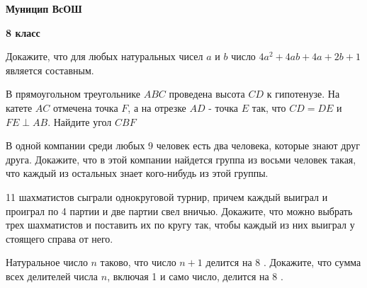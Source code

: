 \centerline{\bf \Huge Муницип ВсОШ}
\centerline{\bf \Huge 8 класс}

\begin{flushright}
        \scriptsize{}
\end{flushright}

Докажите, что для любых натуральных чисел $a$ и $b$ число $4 a^2+4 a b+4 a+2 b+1$ является составным.


В прямоугольном треугольнике $A B C$ проведена высота $C D$ к гипотенузе. На катете $A C$ отмечена точка $F$, а на отрезке $A D$ - точка $E$ так, что $C D=D E$ и $F E \perp A B$. Найдите угол $C B F$


В одной компании среди любых 9 человек есть два человека, которые знают друг друга. Докажите, что в этой компании найдется группа из восьми человек такая, что каждый из остальных знает кого-нибудь из этой группы.


11 шахматистов сыграли однокруговой турнир, причем каждый выиграл и проиграл по 4 партии и две партии свел вничью. Докажите, что можно выбрать трех шахматистов и поставить их по кругу так, чтобы каждый из них выиграл у стоящего справа от него.

Натуральное число $n$ таково, что число $n+1$ делится на 8 . Докажите, что сумма всех делителей числа $n$, включая 1 и само число, делится на 8 .